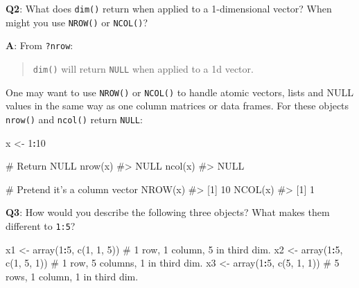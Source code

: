 \documentclass[
]{krantz}
\makeatletter
\newenvironment{Shaded}{\begin{snugshade}}{\end{snugshade}}
\newcommand{\CommentTok}[1]{\textcolor[rgb]{0.56,0.35,0.01}{\textit{#1}}}
\newcommand{\DecValTok}[1]{\textcolor[rgb]{0.00,0.00,0.81}{#1}}
\newcommand{\KeywordTok}[1]{\textcolor[rgb]{0.13,0.29,0.53}{\textbf{#1}}}
\newcommand{\NormalTok}[1]{#1}
\newcommand{\OperatorTok}[1]{\textcolor[rgb]{0.81,0.36,0.00}{\textbf{#1}}}
\newcommand{\StringTok}[1]{\textcolor[rgb]{0.31,0.60,0.02}{#1}}
\newenvironment{kframe}{%
\medskip{}
\setlength{\fboxsep}{.8em}
 \def\at@end@of@kframe{}%
 \ifinner\ifhmode%
  \def\at@end@of@kframe{\end{minipage}}%
  \begin{minipage}{\columnwidth}%
 \fi\fi%
 \def\FrameCommand##1{\hskip\@totalleftmargin \hskip-\fboxsep
 \colorbox{shadecolor}{##1}\hskip-\fboxsep
     \hskip-\linewidth \hskip-\@totalleftmargin \hskip\columnwidth}%
 \MakeFramed {\advance\hsize-\width
   \@totalleftmargin\z@ \linewidth\hsize
   \@setminipage}}%
 {\par\unskip\endMakeFramed%
 \at@end@of@kframe}
\renewenvironment{Shaded}{\begin{kframe}}{\end{kframe}}
\renewcommand{\KeywordTok} [1]{\textcolor[rgb]{0.00,0.44,0.13}{{#1}}}
\renewcommand{\DecValTok}  [1]{\textcolor[rgb]{0.25,0.63,0.44}{{#1}}}
\renewcommand{\StringTok}  [1]{\textcolor[rgb]{0.25,0.44,0.63}{{#1}}}
\renewcommand{\CommentTok} [1]{\textcolor[rgb]{0.38,0.63,0.69}{{#1}}}
\renewcommand{\NormalTok}  [1]{{#1}}
\makeatother
\begin{document}
\textbf{{Q2}}: What does \texttt{dim()} return when applied to a 1-dimensional vector? When might you use \texttt{NROW()} or \texttt{NCOL()}?

\textbf{{A}}: From \texttt{?nrow}:

\begin{quote}
\texttt{dim()} will return \texttt{NULL} when applied to a 1d vector.
\end{quote}

One may want to use \texttt{NROW()} or \texttt{NCOL()} to handle atomic vectors, lists and NULL values in the same way as one column matrices or data frames. For these objects \texttt{nrow()} and \texttt{ncol()} return \texttt{NULL}:

\begin{Shaded}
\begin{Highlighting}[]
\NormalTok{x <-}\StringTok{ }\DecValTok{1}\OperatorTok{:}\DecValTok{10}

\CommentTok{# Return NULL}
\KeywordTok{nrow}\NormalTok{(x)}
\CommentTok{#> NULL}
\KeywordTok{ncol}\NormalTok{(x)}
\CommentTok{#> NULL}

\CommentTok{# Pretend it's a column vector}
\KeywordTok{NROW}\NormalTok{(x)}
\CommentTok{#> [1] 10}
\KeywordTok{NCOL}\NormalTok{(x)}
\CommentTok{#> [1] 1}
\end{Highlighting}
\end{Shaded}

\textbf{{Q3}}: How would you describe the following three objects? What makes them different to \texttt{1:5}?

\begin{Shaded}
\begin{Highlighting}[]
\NormalTok{x1 <-}\StringTok{ }\KeywordTok{array}\NormalTok{(}\DecValTok{1}\OperatorTok{:}\DecValTok{5}\NormalTok{, }\KeywordTok{c}\NormalTok{(}\DecValTok{1}\NormalTok{, }\DecValTok{1}\NormalTok{, }\DecValTok{5}\NormalTok{))  }\CommentTok{# 1 row,  1 column,  5 in third dim.}
\NormalTok{x2 <-}\StringTok{ }\KeywordTok{array}\NormalTok{(}\DecValTok{1}\OperatorTok{:}\DecValTok{5}\NormalTok{, }\KeywordTok{c}\NormalTok{(}\DecValTok{1}\NormalTok{, }\DecValTok{5}\NormalTok{, }\DecValTok{1}\NormalTok{))  }\CommentTok{# 1 row,  5 columns, 1 in third dim.}
\NormalTok{x3 <-}\StringTok{ }\KeywordTok{array}\NormalTok{(}\DecValTok{1}\OperatorTok{:}\DecValTok{5}\NormalTok{, }\KeywordTok{c}\NormalTok{(}\DecValTok{5}\NormalTok{, }\DecValTok{1}\NormalTok{, }\DecValTok{1}\NormalTok{))  }\CommentTok{# 5 rows, 1 column,  1 in third dim.}
\end{Highlighting}
\end{Shaded}
\end{document}
